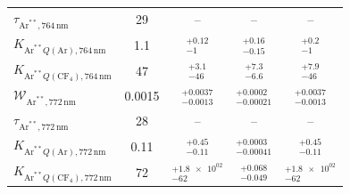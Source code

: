 \begin{table}[htbp]
\begin{tabular}{lcccc}
$\tau_{\mathrm{Ar}^{**},764\,\mathrm{nm}}$ & \num{29} & -- & -- & -- \\
$K_{\mathrm{Ar}^{**}Q(\mathrm{Ar}),764\,\mathrm{nm}}$ & \num{1.1} & $^{+\num{0.12}}_{-\num{1}}$ & $^{+\num{0.16}}_{-\num{0.15}}$ & $^{+\num{0.2}}_{-\num{1}}$ \\
$K_{\mathrm{Ar}^{**}Q(\mathrm{CF}_4),764\,\mathrm{nm}}$ & \num{47} & $^{+\num{3.1}}_{-\num{46}}$ & $^{+\num{7.3}}_{-\num{6.6}}$ & $^{+\num{7.9}}_{-\num{46}}$ \\
$\mathcal{W}_{\mathrm{Ar}^{**},772\,\mathrm{nm}}$ & \num{0.0015} & $^{+\num{0.0037}}_{-\num{0.0013}}$ & $^{+\num{0.0002}}_{-\num{0.00021}}$ & $^{+\num{0.0037}}_{-\num{0.0013}}$ \\
$\tau_{\mathrm{Ar}^{**},772\,\mathrm{nm}}$ & \num{28} & -- & -- & -- \\
$K_{\mathrm{Ar}^{**}Q(\mathrm{Ar}),772\,\mathrm{nm}}$ & \num{0.11} & $^{+\num{0.45}}_{-\num{0.11}}$ & $^{+\num{0.0003}}_{-\num{0.00041}}$ & $^{+\num{0.45}}_{-\num{0.11}}$ \\
$K_{\mathrm{Ar}^{**}Q(\mathrm{CF}_4),772\,\mathrm{nm}}$ & \num{72} & $^{+\num{1.8e+02}}_{-\num{62}}$ & $^{+\num{0.068}}_{-\num{0.049}}$ & $^{+\num{1.8e+02}}_{-\num{62}}$ \\
\bottomrule
\end{tabular}
\end{table}
